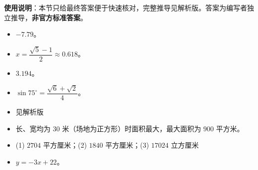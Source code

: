 
\begin{gknotice}
\textbf{使用说明}：本节只给最终答案便于快速核对，完整推导见解析版。答案为编写者独立推导，\textbf{非官方标准答案}。
\end{gknotice}

\begin{itemize}[leftmargin=2.6em]
  \item[\textbf{1.}] $-7.79$。
  \item[\textbf{2.}] $x=\dfrac{\sqrt5-1}{2}\approx0.618$。
  \item[\textbf{3.}] $3.194$。
  \item[\textbf{4.}] $\sin75^\circ=\dfrac{\sqrt6+\sqrt2}{4}$。
  \item[\textbf{5.}] 见解析版
  \item[\textbf{6.}] 长、宽均为 $30$ 米（场地为正方形）时面积最大，最大面积为 $900$ 平方米。
  \item[\textbf{7.}] (1) $2704$ 平方厘米；(2) $1840$ 平方厘米；(3) $17024$ 立方厘米
  \item[\textbf{8.}] $y=-3x+22$。
\end{itemize}
